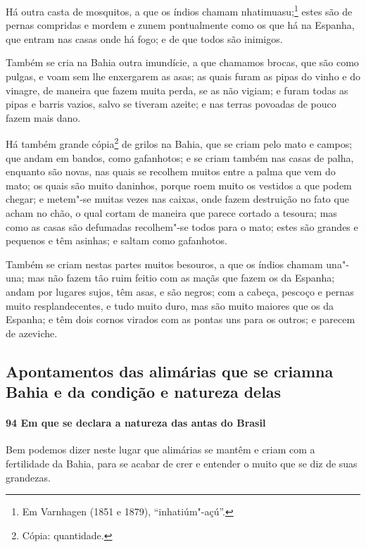 \begin{linenumbers}
Há outra casta de mosquitos, a que os índios chamam nhatimuasu;\footnote{ Em Varnhagen
(1851 e 1879), ``inhatiúm"-açú''.} estes são de pernas compridas e mordem e zunem
pontualmente como os que há na Espanha, que entram nas casas onde há fogo; e de que todos
são inimigos.

Também se cria na Bahia outra imundície, a que chamamos brocas, que são como pulgas, e
voam sem lhe enxergarem as asas; as quais furam as pipas do vinho e do vinagre, de maneira
que fazem muita perda, se as não vigiam; e furam todas as pipas e barris vazios, salvo se
tiveram azeite; e nas terras povoadas de pouco fazem mais dano.

Há também grande cópia\footnote{ Cópia: quantidade.} de grilos na Bahia, que se criam pelo
mato e campos; que andam em bandos, como gafanhotos; e se criam também nas
casas de palha, enquanto são novas, nas quais se recolhem muitos entre a palma que vem do
mato; os quais são muito daninhos, porque roem muito os vestidos a que podem chegar; e
metem"-se muitas vezes nas caixas, onde fazem destruição no fato que acham no chão, o qual
cortam de maneira que parece cortado a tesoura; mas como as casas são defumadas
recolhem"-se todos para o mato; estes são grandes e pequenos e têm asinhas; e saltam como
gafanhotos.

Também se criam nestas partes muitos besouros, a que os índios chamam una"-una; mas não
fazem tão ruim feitio com as maçãs que fazem os da Espanha; andam por lugares sujos, têm
asas, e são negros; com a cabeça, pescoço e pernas muito resplandecentes, e tudo muito
duro, mas são muito maiores que os da Espanha; e têm dois cornos virados com as pontas uns
para os outros; e parecem de azeviche.

\subsection{Apontamentos das alimárias que se criam\break na Bahia e da condição e natureza
delas}

\paragraph{94 Em que se declara a natureza das antas do Brasil}\quad
Bem podemos dizer neste lugar que alimárias se mantêm e criam com a fertilidade da Bahia,
para se acabar de crer e entender o muito que se diz de suas grandezas.


\end{linenumbers}
